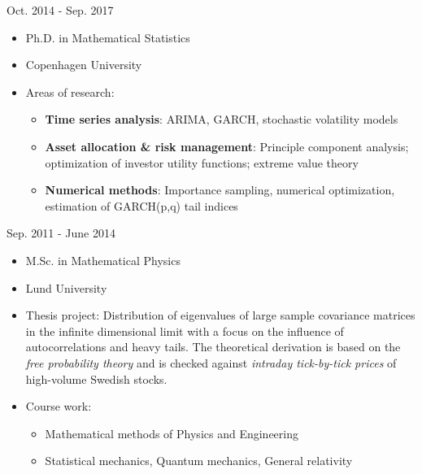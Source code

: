 \documentclass[a4paper]{twentysecondcv} %
\begin{document}
\begin{minipage}{0.15\linewidth}
  Oct. 2014 - Sep. 2017
\end{minipage} \hfill
\begin{minipage}{0.85\linewidth}
  \begin{itemize}
  \item Ph.D. in Mathematical Statistics
  \item Copenhagen University
  \item Areas of research:
    \begin{itemize}
      \item {\bf Time series analysis}: ARIMA, GARCH, stochastic volatility
        models
      \item {\bf Asset allocation \& risk management}: Principle component
        analysis; optimization of investor utility functions; extreme
        value theory
      \item {\bf Numerical methods}: Importance sampling, numerical
        optimization, estimation of GARCH(p,q) tail indices
    \end{itemize}
  \end{itemize}
\end{minipage}

\vspace{3mm}

\begin{minipage}{0.15\linewidth}
  Sep. 2011 - June 2014
\end{minipage} \hfill
\begin{minipage}{0.85\linewidth}
  \begin{itemize}
  \item M.Sc. in Mathematical Physics
  \item Lund University
  \item Thesis project: Distribution of eigenvalues of large
    sample covariance matrices in the infinite dimensional limit with
    a focus on the influence of autocorrelations and heavy tails. The
    theoretical derivation is based on the {\it free probability
      theory} and is checked against {\it intraday tick-by-tick
      prices} of high-volume Swedish stocks.
  \item Course work:    
    \begin{itemize}
      \item Mathematical methods of Physics and Engineering
      \item Statistical mechanics, Quantum mechanics, General
        relativity
    \end{itemize}
  \end{itemize}
\end{minipage}
\end{document}
